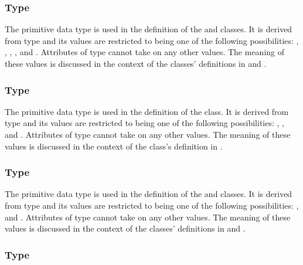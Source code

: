 \subsubsection{Type \fixttspace{}}
\label{primtype-DataKind}

The  primitive data type is used in the definition of the \SampledField and \ParametricGeometry classes.  It is derived from type  and its values are restricted to being one of the following possibilities: , , , , and .  Attributes of type  cannot take on any other values.  The meaning of these values is discussed in the context of the classes' definitions in  and .


\subsubsection{Type \fixttspace{}}
\label{primtype-DiffusionKind}

The  primitive data type is used in the definition of the \DiffusionCoefficient class.  It is derived from type  and its values are restricted to being one of the following possibilities: , , and .  Attributes of type  cannot take on any other values.  The meaning of these values is discussed in the context of the \DiffusionCoefficient class's definition in .


\subsubsection{Type \fixttspace{}}
\label{primtype-CompressionKind}

The  primitive data type is used in the definition of the \SampledField and \ParametricObject classes.  It is derived from type  and its values are restricted to being one of the following possibilities: , and .  Attributes of type  cannot take on any other values.  The meaning of these values is discussed in the context of the classes' definitions in  and .


\subsubsection{Type \fixttspace{}}
\label{primtype-FunctionKind}

